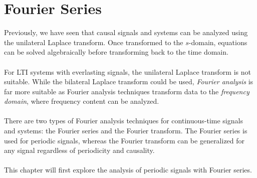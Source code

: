 \documentclass{report}
\begin{document}
\setcounter{chapter}{4}
\setcounter{page}{74}
\chapter{Fourier Series}
Previously, we have seen that causal signals and systems can be analyzed using the unilateral Laplace transform. Once transformed to the $s$-domain, 
equations can be solved algebraically before transforming back to the time domain.
\\ \\
For LTI systems with everlasting signals, the unilateral Laplace transform is not suitable. While the bilateral Laplace transform could be used, \emph{Fourier analysis} is far more 
suitable as Fourier analysis techniques transform data to the \emph{frequency domain}, where frequency content can be analyzed. 
\\ \\
There are two types of Fourier analysis techniques for continuous-time signals and systems: the Fourier series and the Fourier transform. The Fourier series is used for periodic signals, 
whereas the Fourier transform can be generalized for any signal regardless of periodicity and causality.
\\ \\
This chapter will first explore the analysis of periodic signals with Fourier series. 
\end{document}
